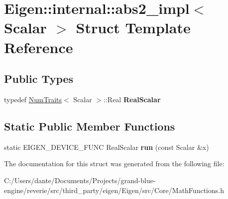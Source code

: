\hypertarget{struct_eigen_1_1internal_1_1abs2__impl}{}\section{Eigen\+::internal\+::abs2\+\_\+impl$<$ Scalar $>$ Struct Template Reference}
\label{struct_eigen_1_1internal_1_1abs2__impl}
\subsection*{Public Types}
\begin{DoxyCompactItemize}
\item 
\mbox{\label{struct_eigen_1_1internal_1_1abs2__impl_aee05f7056950317b7ee99699734e6cbe}} 
typedef \mbox{\hyperlink{struct_eigen_1_1_num_traits}{Num\+Traits}}$<$ Scalar $>$\+::Real {\bfseries Real\+Scalar}
\end{DoxyCompactItemize}
\subsection*{Static Public Member Functions}
\begin{DoxyCompactItemize}
\item 
\mbox{\label{struct_eigen_1_1internal_1_1abs2__impl_a38670c36d759d3b4e58a940ebdead693}} 
static E\+I\+G\+E\+N\+\_\+\+D\+E\+V\+I\+C\+E\+\_\+\+F\+U\+NC Real\+Scalar {\bfseries run} (const Scalar \&x)
\end{DoxyCompactItemize}


The documentation for this struct was generated from the following file\+:\begin{DoxyCompactItemize}
\item 
C\+:/\+Users/dante/\+Documents/\+Projects/grand-\/blue-\/engine/reverie/src/third\+\_\+party/eigen/\+Eigen/src/\+Core/Math\+Functions.\+h\end{DoxyCompactItemize}
